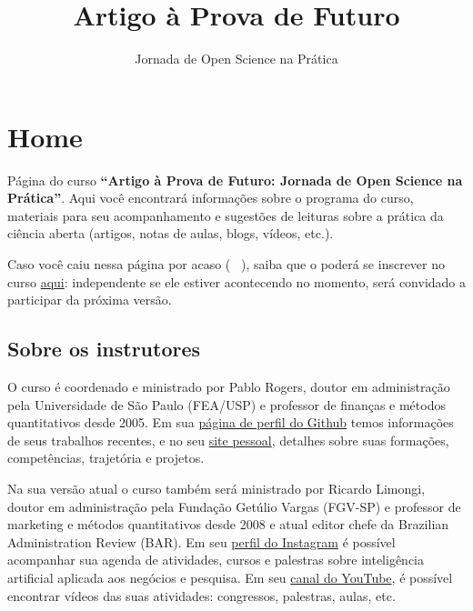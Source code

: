 \documentclass[
  a4paper,
]{article}
\title{Artigo à Prova de Futuro}
\subtitle{Jornada de Open Science na Prática}
\author{}
\date{}
\begin{document}
\maketitle


\section*{Home 🏢}\label{sec-home}


Página do curso \textbf{``Artigo à Prova de Futuro: Jornada de Open
Science na Prática''}. Aqui você encontrará informações sobre o programa
do curso, materiais para seu acompanhamento e sugestões de leituras
sobre a prática da ciência aberta (artigos, notas de aulas, blogs,
vídeos, etc.).

Caso você caiu nessa página por acaso (🤣😁😉), saiba que o poderá se
inscrever no curso \href{https://forms.gle/b6Zio7oL8XxxhhtS9}{aqui}:
independente se ele estiver acontecendo no momento, será convidado a
participar da próxima versão.

\subsection*{Sobre os instrutores}\label{sec-instrutor}


O curso é coordenado e ministrado por Pablo Rogers, doutor em
administração pela Universidade de São Paulo (FEA/USP) e professor de
finanças e métodos quantitativos desde 2005. Em sua
\href{https://github.com/phdpablo}{página de perfil do Github} temos
informações de seus trabalhos recentes, e no seu
\href{https://phdpablo.com/}{site pessoal}, detalhes sobre suas
formações, competências, trajetória e projetos.

Na sua versão atual o curso também será ministrado por Ricardo Limongi,
doutor em administração pela Fundação Getúlio Vargas (FGV-SP) e
professor de marketing e métodos quantitativos desde 2008 e atual editor
chefe da Brazilian Administration Review (BAR). Em seu
\href{https://www.instagram.com/limongi/}{perfil do Instagram} é
possível acompanhar sua agenda de atividades, cursos e palestras sobre
inteligência artificial aplicada aos negócios e pesquisa. Em seu
\href{https://www.youtube.com/@ricardolimongi_ia}{canal do YouTube}, é
possível encontrar vídeos das suas atividades: congressos, palestras,
aulas, etc.
\end{document}
